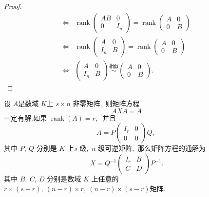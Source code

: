 \begin{proof}
$$\begin{aligned}
		\Longleftrightarrow& \operatorname{rank}\left(\begin{array}{cc}
			A B & 0 \\
			0 & I_{n}
		\end{array}\right)=\operatorname{rank}\left(\begin{array}{cc}
			A & 0 \\
			0 & B
		\end{array}\right) \\
		\Longleftrightarrow& \operatorname{rank}\left(\begin{array}{cc}
			A & 0 \\
			I_{n} & B
		\end{array}\right)=\operatorname{rank}\left(\begin{array}{cc}
			A & 0 \\
			0 & B
		\end{array}\right) \\
		\Longleftrightarrow&\begin{pmatrix}
			A   & 0\\
			I_n & B
		\end{pmatrix}\stackrel{\text{相似}}{\sim}\begin{pmatrix}
			A & 0\\
			0 & B
		\end{pmatrix}.
	\end{aligned}$$
\end{proof}
\newpage
\begin{problem}
	设  $A  $是数域 $ K  $上 $ s \times n $ 非零矩阵,\  则矩阵方程
	$$A X A=A$$
	一定有解.如果 $ \operatorname{rank}(A)=r ,\ $ 并且
	\begin{equation}
		A=P\left(\begin{array}{ll}
			I_{r} & 0 \\
			0 & 0
		\end{array}\right) Q,\ \label{1.6.2}
	\end{equation}
	其中 $ P,\  Q $ 分别是  $K $ 上$  s $ 级,\ $ n$  级可逆矩阵,\  那么矩阵方程的通解为
	$$X=Q^{-1}\left(\begin{array}{ll}
		I_{r} & B \\
		C & D
	\end{array}\right) P^{-1}.$$
	其中  $B,\  C,\  D $ 分别是数域 $ K $ 上任意的$  r \times(s-r),\ (n-r) \times r,\ (n-r) \times(s-r)  $矩阵.
\end{problem}
